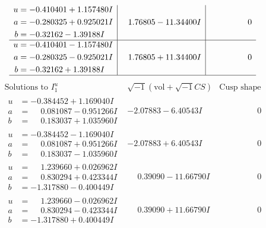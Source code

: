 \documentclass[1p]{elsarticle_modified}
\theoremstyle{definition}
\newcommand{\I}{\sqrt{-1}}
\begin{document}
$$\begin{array}{c|c|c}
\begin{aligned}
u &= -0.410401 + 1.157480 I \\
a &= -0.280325 + 0.925021 I \\
b &= -0.32162 - 1.39188 I\end{aligned}
 & \phantom{-}1.76805 - 11.34400 I & \phantom{-0.000000 } 0 \\ \hline\begin{aligned}
u &= -0.410401 - 1.157480 I \\
a &= -0.280325 - 0.925021 I \\
b &= -0.32162 + 1.39188 I\end{aligned}
 & \phantom{-}1.76805 + 11.34400 I & \phantom{-0.000000 } 0\\
 \hline 
 \end{array}$$\newpage$$\begin{array}{c|c|c}  
\text{Solutions to }I^u_{1}& \I (\text{vol} + \sqrt{-1}CS) & \text{Cusp shape}\\
 \hline 
\begin{aligned}
u &= -0.384452 + 1.169040 I \\
a &= \phantom{-}0.081087 - 0.951266 I \\
b &= \phantom{-}0.183037 + 1.035960 I\end{aligned}
 & -2.07883 - 6.40543 I & \phantom{-0.000000 } 0 \\ \hline\begin{aligned}
u &= -0.384452 - 1.169040 I \\
a &= \phantom{-}0.081087 + 0.951266 I \\
b &= \phantom{-}0.183037 - 1.035960 I\end{aligned}
 & -2.07883 + 6.40543 I & \phantom{-0.000000 } 0 \\ \hline\begin{aligned}
u &= \phantom{-}1.239660 + 0.026962 I \\
a &= \phantom{-}0.830294 + 0.423344 I \\
b &= -1.317880 - 0.400449 I\end{aligned}
 & \phantom{-}0.39090 - 11.66790 I & \phantom{-0.000000 } 0 \\ \hline\begin{aligned}
u &= \phantom{-}1.239660 - 0.026962 I \\
a &= \phantom{-}0.830294 - 0.423344 I \\
b &= -1.317880 + 0.400449 I\end{aligned}
 & \phantom{-}0.39090 + 11.66790 I & \phantom{-0.000000 } 0 \\ \hline\begin{aligned}

\end{aligned}
\end{array}$$
\end{document}

